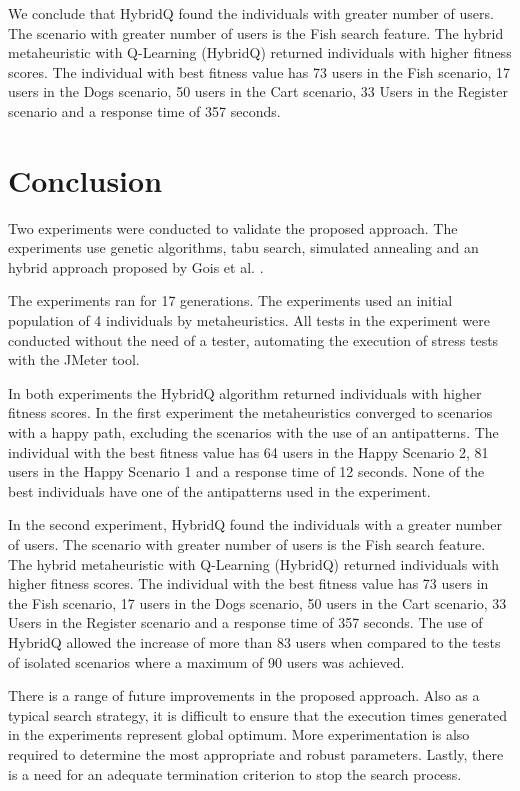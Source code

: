 \documentclass{bmcart}
\begin{document}
We conclude that HybridQ found the individuals with greater number of users. The scenario with greater number of users is the Fish search feature. The hybrid metaheuristic with Q-Learning (HybridQ) returned individuals with higher fitness scores.  The individual with best fitness value has 73 users in the Fish scenario, 17 users in the Dogs scenario, 50 users in the Cart scenario, 33 Users in the Register scenario  and a response time of 357 seconds. 


\section{Conclusion}

Two experiments were conducted to validate the proposed approach. The experiments use genetic algorithms, tabu search, simulated annealing and an hybrid approach proposed by Gois et al. \citep{Gois2016}.

The experiments ran for 17 generations. The experiments used an initial population of 4 individuals by metaheuristics. All tests in the experiment were conducted without the need of a tester, automating the execution of stress tests with the JMeter tool.

In both experiments the HybridQ algorithm returned individuals with higher fitness scores.  In the first experiment the metaheuristics converged to scenarios with a happy path, excluding the scenarios with the use of an antipatterns. The individual with the best fitness value has 64 users in the Happy Scenario 2, 81 users in the Happy Scenario 1 and a response time of 12 seconds. None of the best individuals have one of the antipatterns used in the experiment.


In the second experiment, HybridQ found the individuals with a greater number of users. The scenario with greater number of users is the Fish search feature. The hybrid metaheuristic with Q-Learning (HybridQ) returned individuals with higher fitness scores.  The individual with the best fitness value has 73 users in the Fish scenario, 17 users in the Dogs scenario, 50 users in the Cart scenario, 33 Users in the Register scenario  and a response time of 357 seconds. The use of HybridQ allowed the increase of more than 83 users when compared to the tests of isolated scenarios where a maximum of 90 users was achieved.


There is a range of future improvements in the proposed approach. Also as a typical search strategy, it is difficult to ensure that the execution times generated in the experiments represent global optimum. More experimentation is also required to determine the most appropriate and robust parameters. Lastly, there is a need for an adequate termination criterion to stop the search process.
\end{document}
